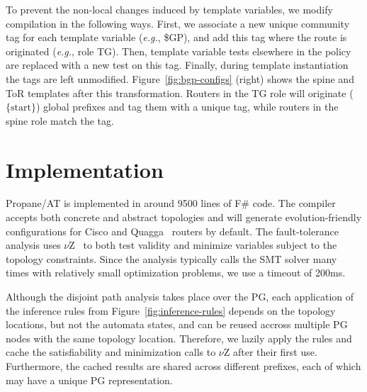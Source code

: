 \documentclass[numbers, 10pt, preprint]{sigplanconf}
\newcommand{\EG}{\emph{e.g.}}
\newcommand{\sysname}{{\text{}\small \sf Propane/AT}\xspace}
\begin{document}
To prevent the non-local changes induced by template variables, we modify compilation in the following ways. First, we associate a new unique community tag for each template variable (\EG, {\small \$GP}), and add this tag where the route is originated (\EG, role TG). Then, template variable tests elsewhere in the policy are replaced with a new test on this tag. Finally, during template instantiation the tags are left unmodified.
Figure~\ref{fig:bgp-configs} (right) shows the spine and ToR templates after this transformation. Routers in the TG role will originate ($\{ \mathrm{start} \}$) global prefixes and tag them with a unique tag, while routers in the spine role match the tag.


%
%
%
%

\section{Implementation}
\label{sec:implementation}

\sysname is implemented in around 9500 lines of F\# code. The compiler accepts both concrete and abstract topologies and will generate evolution-friendly configurations for Cisco and Quagga~\cite{quagga} routers by default. The fault-tolerance analysis uses $\nu$Z~\cite{z3opt} to both test validity and minimize variables subject to the topology constraints. Since the analysis typically calls the SMT solver many times with relatively small optimization problems, we use a timeout of 200ms.

Although the disjoint path analysis takes place over the PG, each application of the inference rules from Figure~\ref{fig:inference-rules} depends on the topology locations, but not the automata states, and can be reused accross multiple PG nodes with the same topology location. Therefore, we lazily apply the rules and cache the satisfiability and minimization calls to $\nu$Z after their first use. Furthermore, the cached results are shared across different prefixes, each of which may have a unique PG representation.
\end{document}
